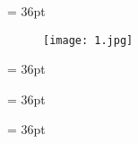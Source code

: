 \documentclass[a4paper]{article}
\begin{document}
\pagestyle{fancy} 
\begin{center}
\end{center}
\setlength{\columnsep}{0.5em} 
\setlength\columnseprule{0.4pt} 
\begin{multicols}{2}{\raggedright} 
\hangindent= 36pt
\begin{center}

\begin{wrapfigure}
\begin{center}
\texttt{[image: 1.jpg]} 
\caption{}
\end{center}
\end{wrapfigure}



\end{center}


\hangindent= 36pt
\markboth{ \headwordafterentryletDatadicBody   }{ \headwordafterentryletDatadicBody   }\headwordafterentryletDatadicBody{ }

\hangindent= 36pt
\markboth{ \headwordafterentryletDatadicBody   }{ \headwordafterentryletDatadicBody   }\headwordafterentryletDatadicBody{ }

\hangindent= 36pt
\markboth{ \headwordafterentryletDatadicBody   }{ \headwordafterentryletDatadicBody   }\headwordafterentryletDatadicBody{ }


\end{multicols}
\end{document}
